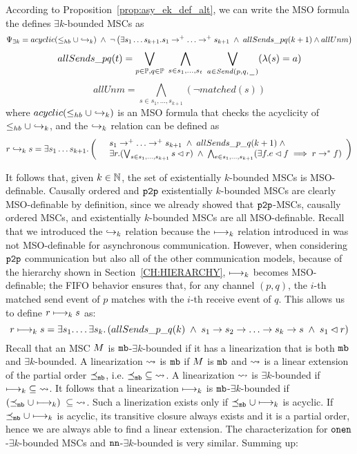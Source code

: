 \noindent According to Proposition~\ref{prop:asy_ek_def_alt}, we can write the MSO formula the defines $\exists k$-bounded MSCs as
\[
\Psi_{\exists k}=
acyclic(\happensbefore \cup \relbAsy) \;\wedge\;
\neg \left(
	\exists s_1 \dots s_{k+1}. s_1 \procrel^+ \dots \procrel^+ s_{k+1} \;\wedge \;
	allSends\_pq(k+1) \wedge allUnm
\right)
\]
\[
allSends\_pq (t) =
\bigvee_{\substack{p \in \mathbb{P}, q \in \mathbb{P}}}\;
\bigwedge_{s \in {s_1, ..., s_{t}}}\;
\bigvee_{a \in {\mathit{Send}(p,q,\hspace{0.1em}\underline{\hspace{0.5em}}\hspace{0.1em})}}
(\lambda(s) = a)
\]
\[
allUnm = \bigwedge_{s \in {s_1, ..., s_{k+1}}}(\neg \mathit{matched}(s))
\]
where $acyclic(\leq_{hb} \cup \hookrightarrow_{k})$ is an MSO formula that checks the acyclicity of $\leq_{hb} \cup \hookrightarrow_{k}$, and the $\hookrightarrow_{k}$ relation can be defined as
\[
r \relbAsy s= \exists s_1 \dots s_{k+1}. \left(
\begin{array}{rl}
	& s_1 \procrel^+ \dots \procrel^+ s_{k+1} \;\wedge\;
	allSends\_p\_q(k+1) \;\wedge\; \\
	& \exists r. (\bigvee_{s \in {s_1, ..., s_{k+1}}}s \lhd r) \;\wedge\;
	\bigwedge_{e \in {s_1, ..., s_{k+1}}}(\exists f.e \lhd f \implies r \procrel^* f) \\
\end{array}
\right)
\]

\medskip

It follows that, given $k \in \mathbb{N}$, the set of existentially $k$-bounded MSCs is MSO-definable. Causally ordered and $\mathtt{p2p}$ existentially $k$-bounded MSCs are clearly MSO-definable by definition, since we already showed that $\mathtt{p2p}$-MSCs, causally ordered MSCs, and existentially $k$-bounded MSCs are all MSO-definable. Recall that we introduced the $\hookrightarrow_{k}$ relation because the $\longmapsto_k$ relation introduced in \cite{DBLP:conf/fossacs/LohreyM02} was not MSO-definable for asynchronous communication. However, when considering $\mathtt{p2p}$ communication but also all of the other communication models, because of the hierarchy shown in Section~\ref{CH:HIERARCHY}, $\longmapsto_k$ becomes MSO-definable; the FIFO behavior ensures that, for any channel $(p,q)$, the $i$-th matched send event of $p$ matches with the $i$-th receive event of $q$. This allows us to define $r \longmapsto_k s$ as:
\[
r \relb s=\exists s_1. \dots \exists s_k.\left(
allSends\_p\_q(k)
\;\wedge\; s_1\procrel s_2\procrel\dots
\procrel s_k\procrel s
\;\wedge\; s_1 \lhd r
\right)
\]
Recall that an MSC $M$ is $\mathtt{mb}$-$\exists k$-bounded if it has a linearization that is both $\mathtt{mb}$ and $\exists k$-bounded. A linearization $\rightsquigarrow$ is $\mathtt{mb}$ if $M$ is $\mathtt{mb}$ and $\rightsquigarrow$ is a linear extension of the partial order $\preceq_{\mathtt{mb}}$, i.e. $\preceq_{\mathtt{mb}} \;\subseteq\; \rightsquigarrow$. A linearization $\rightsquigarrow$ is $\exists k$-bounded if $\longmapsto_k \;\subseteq\; \rightsquigarrow$. It follows that a linearization $\longmapsto_k$ is $\mathtt{mb}$-$\exists k$-bounded if $(\preceq_{\mathtt{mb}} \cup \longmapsto_k) \;\subseteq\; \rightsquigarrow$. Such a linerization exists only if $\preceq_{\mathtt{mb}} \cup \longmapsto_k$ is acyclic. If $\preceq_{\mathtt{mb}} \cup \longmapsto_k$ is acyclic, its transitive closure always exists and it is a partial order, hence we are always able to find a linear extension. The characterization for $\mathtt{onen}$-$\exists k$-bounded MSCs and $\mathtt{nn}$-$\exists k$-bounded is very similar. Summing up:

